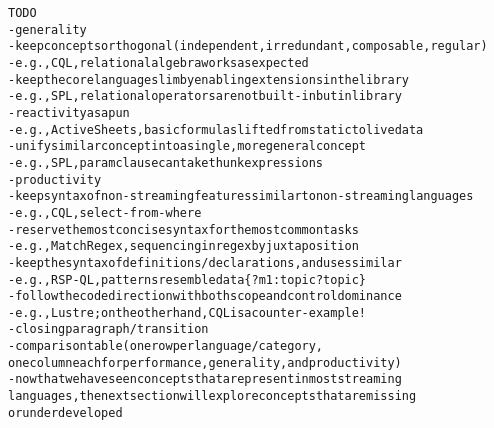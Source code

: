 \begin{alltt}TODO\scriptsize
- generality
  - keep concepts orthogonal (independent, irredundant, composable, regular)
    - e.g., CQL, relational algebra works as expected
  - keep the core language slim by enabling extensions in the library
    - e.g., SPL, relational operators are not built-in but in library
  - reactivity as a pun
    - e.g., ActiveSheets, basic formulas lifted from static to live data
  - unify similar concept into a single, more general concept
    - e.g., SPL, param clause can take thunk expressions
- productivity
  - keep syntax of non-streaming features similar to non-streaming languages
    - e.g., CQL, select-from-where
  - reserve the most concise syntax for the most common tasks
    - e.g., MatchRegex, sequencing in regex by juxtaposition
  - keep the syntax of definitions/declarations, and uses similar
    - e.g., RSP-QL, patterns resemble data \{ ?m1 :topic ?topic \}
  - follow the code direction with both scope and control dominance
    - e.g., Lustre; on the other hand, CQL is a counter-example!
- closing paragraph / transition
  - comparison table (one row per language/category,
    one column each for performance, generality, and productivity)
  - now that we have seen concepts that are present in most streaming
    languages, the next section will explore concepts that are missing
    or underdeveloped
\end{alltt}
